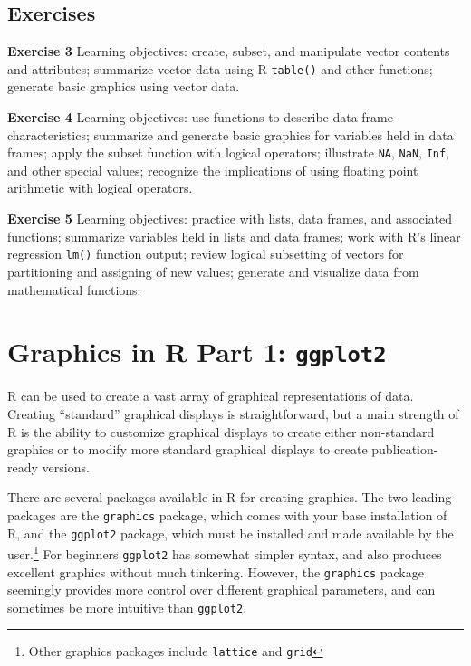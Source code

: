 \documentclass[
]{krantz}
\begin{document}
\hypertarget{exChapter4}{%
\section{Exercises}\label{exChapter4}}

\textbf{Exercise 3} Learning objectives: create, subset, and manipulate vector contents and attributes; summarize vector data using R \texttt{table()} and other functions; generate basic graphics using vector data.

\textbf{Exercise 4} Learning objectives: use functions to describe data frame characteristics; summarize and generate basic graphics for variables held in data frames; apply the subset function with logical operators; illustrate \texttt{NA}, \texttt{NaN}, \texttt{Inf}, and other special values; recognize the implications of using floating point arithmetic with logical operators.

\textbf{Exercise 5} Learning objectives: practice with lists, data frames, and associated functions; summarize variables held in lists and data frames; work with R's linear regression \texttt{lm()} function output; review logical subsetting of vectors for partitioning and assigning of new values; generate and visualize data from mathematical functions.

\hypertarget{graphics-in-r-part-1-ggplot2}{%
\chapter{\texorpdfstring{Graphics in R Part 1: \texttt{ggplot2}}{Graphics in R Part 1: ggplot2}}\label{graphics-in-r-part-1-ggplot2}}

R can be used to create a vast array of graphical representations of data. Creating ``standard'' graphical displays is straightforward, but a main strength of R is the ability to customize graphical displays to create either non-standard graphics or to modify more standard graphical displays to create publication-ready versions.

There are several packages available in R for creating graphics. The two leading packages are the \texttt{graphics} package, which comes with your base installation of R, and the \texttt{ggplot2} package, which must be installed and made available by the user.\footnote{Other graphics packages include \texttt{lattice} and \texttt{grid}} For beginners \texttt{ggplot2} has somewhat simpler syntax, and also produces excellent graphics without much tinkering. However, the \texttt{graphics} package seemingly provides more control over different graphical parameters, and can sometimes be more intuitive than \texttt{ggplot2}.
\end{document}
